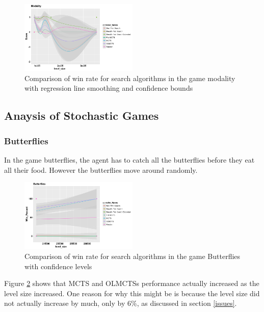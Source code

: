 \documentclass[journal]{IEEEtran}
\begin{document}
		\begin{figure}[h]
		    \centering
		    \includegraphics[width=0.5\textwidth]{Scatter/game_16_Score_smoothing_confidence}
		    \caption{ Comparison of win rate for search algorithms in the game modality with regression line smoothing and confidence bounds}
		    \label{fig:game_4_score_confidence}
		\end{figure}

		
		



	 \subsection{Anaysis of Stochastic Games} \label{AoSG}
		\subsubsection{Butterflies}
		In the game butterflies, the agent has to catch all the butterflies before they eat all their food. However the butterflies move around randomly.

		\begin{figure}[h]
		    \centering
		    \includegraphics[width=0.5\textwidth]{Scatter/game_11_name_confidence}
		    \caption{ Comparison of win rate for search algorithms in the game Butterflies with confidence levels }
		    \label{fig:game_11_win}
		\end{figure}
		Figure \ref{fig:game_11_win} shows that MCTS and OLMCTSs performance actually increased as the level size increased. One reason for why this might be is because the level size did not actually increase by much, only by 6\%, as discussed in section \ref{issues}.
\end{document}
